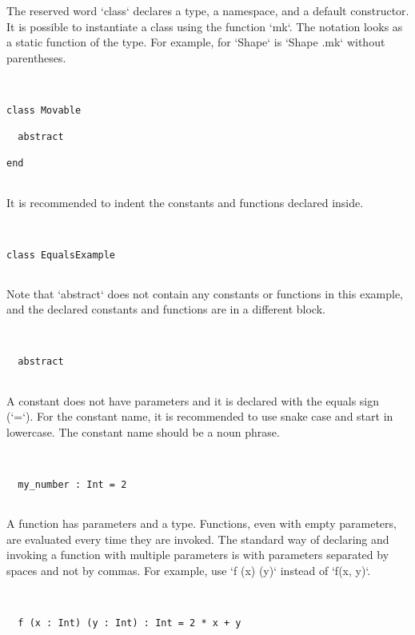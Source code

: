\documentclass[12pt,a4paper]{article}
\begin{document}
The reserved word `class` declares a type, a namespace, and a default constructor.
 It is possible to instantiate a class using the function `mk`. The notation looks
 as a static function of the type. For example, for `Shape` is `Shape .mk` without
 parentheses.


\begin{lstlisting}


class Movable

  abstract

end


\end{lstlisting}

It is recommended to indent the constants and functions declared inside.


\begin{lstlisting}


class EqualsExample


\end{lstlisting}

  Note that `abstract` does not contain any constants or functions in this example, and the
   declared constants and functions are in a different block.


\begin{lstlisting}


  abstract


\end{lstlisting}

  A constant does not have parameters and it is declared with the equals sign (`=`).
   For the constant name, it is recommended to use snake case and start in lowercase.
   The constant name should be a noun phrase.


\begin{lstlisting}


  my_number : Int = 2


\end{lstlisting}

  A function has parameters and a type. Functions, even with empty parameters, are evaluated
   every time they are invoked. The standard way of declaring and invoking a function
   with multiple parameters is with parameters separated by spaces and not by commas.
   For example, use `f (x) (y)` instead of `f(x, y)`.


\begin{lstlisting}


  f (x : Int) (y : Int) : Int = 2 * x + y


\end{lstlisting}
\end{document}
